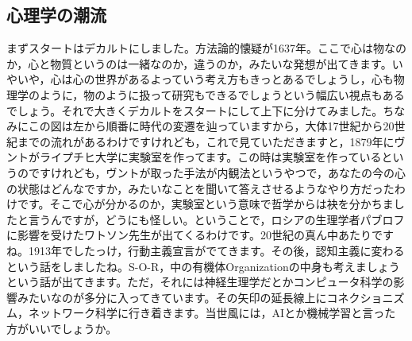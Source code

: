 \documentclass{ltjsbook}
\begin{document}
\subsection{心理学の潮流}
まずスタートはデカルトにしました。方法論的懐疑が1637年。ここで心は物なのか，心と物質というのは一緒なのか，違うのか，みたいな発想が出てきます。いやいや，心は心の世界があるよっていう考え方もきっとあるでしょうし，心も物理学のように，物のように扱って研究もできるでしょうという幅広い視点もあるでしょう。それで大きくデカルトをスタートにして上下に分けてみました。ちなみにこの図は左から順番に時代の変遷を辿っていますから，大体17世紀から20世紀までの流れがあるわけですけれども，これで見ていただきますと，1879年にヴントがライプチヒ大学に実験室を作ってます。この時は実験室を作っているというのですけれども，ヴントが取った手法が内観法というやつで，あなたの今の心の状態はどんなですか，みたいなことを聞いて答えさせるようなやり方だったわけです。そこで心が分かるのか，実験室という意味で哲学からは袂を分かちましたと言うんですが，どうにも怪しい。ということで，ロシアの生理学者パブロフに影響を受けたワトソン先生が出てくるわけです。20世紀の真ん中あたりですね。1913年でしたっけ，行動主義宣言がでてきます。その後，認知主義に変わるという話をしましたね。S-O-R，中の有機体Organizationの中身も考えましょうという話が出てきます。ただ，それには神経生理学だとかコンピュータ科学の影響みたいなのが多分に入ってきています。その矢印の延長線上にコネクショニズム，ネットワーク科学に行き着きます。当世風には，AIとか機械学習と言った方がいいでしょうか。
\end{document}
